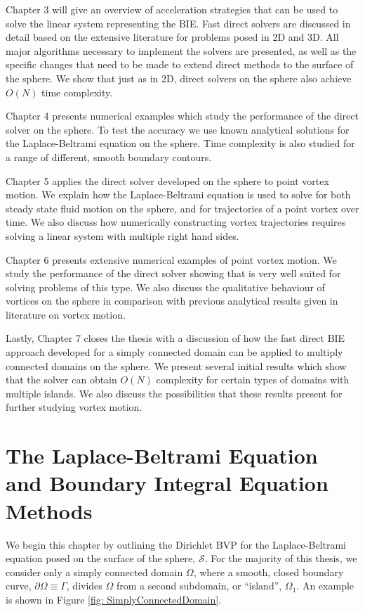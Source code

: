 \documentclass{sfuthesis}
\begin{document}
Chapter 3 will give an overview of acceleration strategies that can be used to solve the linear system representing the BIE.  Fast direct solvers are discussed in detail based on the extensive literature for problems posed in 2D and 3D. All major algorithms necessary to implement the solvers are presented, as well as the specific changes that need to be made to extend direct methods to the surface of the sphere. We show that just as in 2D, direct solvers on the sphere also achieve $O(N)$ time complexity. 

Chapter 4 presents numerical examples which study the performance of the direct solver on the sphere. To test the accuracy we use known analytical solutions for the Laplace-Beltrami equation on the sphere. Time complexity is also studied for a range of different, smooth boundary contours. 

Chapter 5 applies the direct solver developed on the sphere to point vortex motion. We explain how the Laplace-Beltrami equation is used to solve for both steady state fluid motion on the sphere, and for trajectories of a point vortex over time. We also discuss how numerically constructing vortex trajectories requires solving a linear system with multiple right hand sides. 

Chapter 6 presents extensive numerical examples of point vortex motion. We study the performance of the direct solver showing that is very well suited for solving problems of this type. We also discuss the qualitative behaviour of vortices on the sphere in comparison with previous analytical results given in literature on vortex motion. 

Lastly, Chapter 7 closes the thesis with a discussion of how the fast direct BIE approach developed for a simply connected domain can be applied to multiply connected domains on the sphere. We present several initial results which show that the solver can obtain $O(N)$ complexity for certain types of domains with multiple islands. We also discuss the possibilities that these results present for further studying vortex motion. 

\chapter{The Laplace-Beltrami Equation and Boundary Integral Equation Methods}
\label{two}

We begin this chapter by outlining the Dirichlet BVP for the Laplace-Beltrami equation posed on the surface of the sphere, $\mathcal{S}$. For the majority of this thesis, we consider only a simply connected domain $\Omega$, where a smooth, closed boundary curve, $\partial \Omega \equiv \Gamma$, divides $\Omega$ from a second subdomain, or  \enquote{island}, $\Omega_1$. An example is shown in Figure \ref{fig: SimplyConnectedDomain}. 
\end{document}
